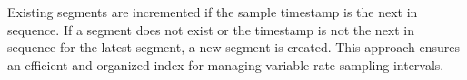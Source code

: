 \documentclass[conference]{IEEEtran}
\def\BibTeX{{\rm B\kern-.05em{\sc i\kern-.025em b}\kern-.08em
    T\kern-.1667em\lower.7ex\hbox{E}\kern-.125emX}}
\begin{document}
Existing segments are incremented if the sample timestamp is the next in sequence. If a segment does not exist or the timestamp is not the next in sequence for the latest segment, a new segment is created. This approach ensures an efficient and organized index for managing variable rate sampling intervals.














\end{document}
